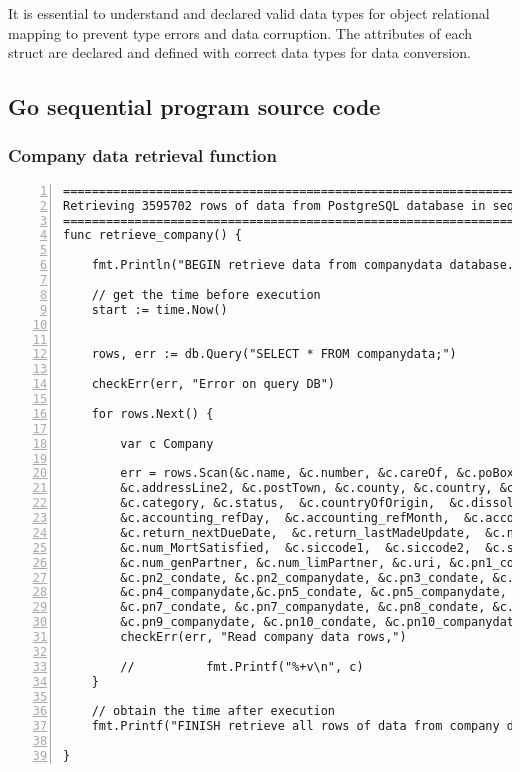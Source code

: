 It is essential to understand and declared valid data types for object relational mapping to prevent type errors and data corruption. The attributes of each struct are declared and defined with correct data types for data conversion.  

\newpage

\subsection{Go sequential program source code}

\subsubsection{Company data retrieval function}

\lstset{basicstyle=\ttfamily\tiny}  
\begin{lstlisting}[breaklines, frame=single, numbers=left, caption={Function for company data retrieval. (retrieve\_company.go)}, label=commandline-02]
=============================================================================
Retrieving 3595702 rows of data from PostgreSQL database in sequential manner
=============================================================================
func retrieve_company() {

	fmt.Println("BEGIN retrieve data from companydata database.")
	
	// get the time before execution
	start := time.Now()
	
	
	rows, err := db.Query("SELECT * FROM companydata;")
	
	checkErr(err, "Error on query DB")	
	
	for rows.Next() {
	
		var c Company
		
		err = rows.Scan(&c.name, &c.number, &c.careOf, &c.poBox, &c.addressLine1, 
		&c.addressLine2, &c.postTown, &c.county, &c.country, &c.postcode, 
		&c.category, &c.status,  &c.countryOfOrigin,  &c.dissolution_date,  &c.incorporate_date,
		&c.accounting_refDay,  &c.accounting_refMonth,  &c.account_nextDueDate,  &c.account_lastMadeUpdate,  &c.account_category,
		&c.return_nextDueDate,  &c.return_lastMadeUpdate,  &c.num_MortChanges,  &c.num_MortOutstanding,  &c.num_MortPartSatisfied,
		&c.num_MortSatisfied,  &c.siccode1,  &c.siccode2,  &c.siccode3,  &c.siccode4,
		&c.num_genPartner, &c.num_limPartner, &c.uri, &c.pn1_condate, &c.pn1_companydate, 
		&c.pn2_condate, &c.pn2_companydate, &c.pn3_condate, &c.pn3_companydate, &c.pn4_condate,
		&c.pn4_companydate,&c.pn5_condate, &c.pn5_companydate, &c.pn6_condate, &c.pn6_companydate, 
		&c.pn7_condate, &c.pn7_companydate, &c.pn8_condate, &c.pn8_companydate, &c.pn9_condate, 
		&c.pn9_companydate, &c.pn10_condate, &c.pn10_companydate, &c.conf_stmtNextDueDate, &c.conf_stmtLastMadeUpdate)
		checkErr(err, "Read company data rows,")
		
		//			fmt.Printf("%+v\n", c)
	}
	
	// obtain the time after execution
	fmt.Printf("FINISH retrieve all rows of data from company database with %.5fs seconds. \n", time.Since(start).Seconds())

}

\end{lstlisting}

